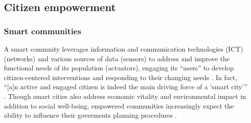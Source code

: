 \subsection{Citizen empowerment}

\subsubsection{Smart communities}
A smart commnity leverages information and communication technologies (ICT) (networks) and various sources of data (sensors) to address and improve the functional needs of its population (actuators), engaging its ``users'' to develop citizen-centered interventions and responding to their changing needs \cite{Williams2016,Roche2012, Afzalan2017}. %
In fact, {“[a]n active and engaged citizen is indeed the main driving force of a `smart city''' \cite{Oliveira2021}}. Though smart cities also address economic vitality and environmental impact in addition to social well-being, empowered communities increasingly expect the ability to influence their goverments planning procedures \cite{Williams2016}. %
